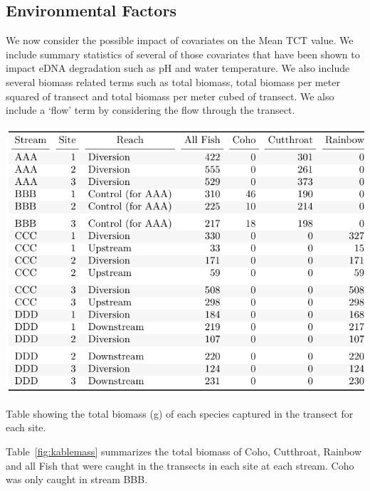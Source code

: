 \subsection{Environmental Factors}


We now consider the possible impact of covariates on the Mean TCT value. We include summary statistics of several of those covariates that have been shown to impact eDNA degradation such as pH and water temperature. We also include several biomass related terms such as total biomass, total biomass per meter squared of transect and total biomass per meter cubed of transect. We also include a `flow' term by considering the flow through the transect. 



\begin{table}[H]
\includegraphics{Chapter5Images/biomass_kable.pdf}
\caption{ \hspace{1mm} Table showing the total biomass (g) of each species captured in the transect for each site.}
\label{fig:kablemass}
\end{table}


Table~\ref{fig:kablemass} summarizes the total biomass of Coho, Cutthroat, Rainbow and all Fish that were caught in the transects in each site at each stream. Coho was only caught in stream BBB.


